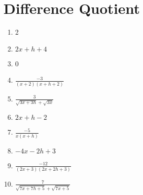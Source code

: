\section*{Difference Quotient}

\begin{enumerate}
	\item 2
	\item $2x + h + 4$
	\item 0
    \item $\frac{-3}{(x+2)(x+h+2)}$
    \item $\frac{3}{\sqrt{3x+3h}+\sqrt{3x}}$
    \item $2x+h-2$
    \item $\frac{-5}{x(x+h)}$
    \item $-4x-2h+3$
    \item $\frac{-12}{(2x+3)(2x+2h+3)}$
    \item $\frac{7}{\sqrt{7x+7h+5}+\sqrt{7x+5}}$
\end{enumerate}